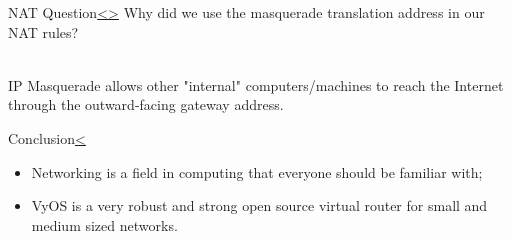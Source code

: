 \documentclass[12pt]{article}
\newenvironment{instructionblock}{\Large\bgroup}{\egroup}
\begin{document}



\pagebreak
\begin{slide}{NAT Question}{\hyperref[slide 19]{\textless}\hyperref[slide 21]{\textgreater}}
\begin{instructionblock}
Why did we use the masquerade translation address in our NAT rules?
\end{instructionblock}\\\\
\end{slide}

\vfill
IP Masquerade allows other "internal" computers/machines to reach the Internet through the outward-facing gateway address.

\pagebreak
\begin{slide}{Conclusion}{\hyperref[slide 20]{\textless}}
\begin{instructionblock}
\begin{itemize}
\item Networking is a field in computing that everyone should be familiar with;
\item VyOS is a very robust and strong open source virtual router for small and medium sized networks.

\end{itemize}
\end{instructionblock}
\end{slide}
\end{document}
